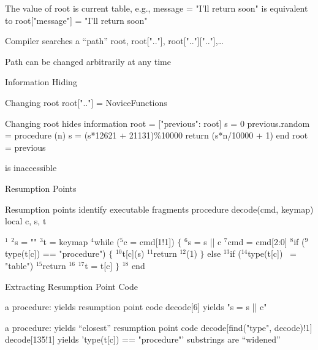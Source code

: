 \Bullet The value of {\pt root} is current table, e.g.,
\program
		message = "I'll return soon"
\endprogram
\medskip
		is equivalent to
\program
		root["message"] = "I'll return soon"
\endprogram

\Bullet Compiler searches a ``path''
		 {\pt root, root[".."], root[".."][".."],}\dots

\Bullet Path can be changed arbitrarily at any time
\NewPage
\centerline{\bigrm Information Hiding}\Longtrue
\Bullet Changing {\pt root}
\program
		root[".."] = NoviceFunctions
\endprogram

\Bullet Changing {\pt root} hides information
\program
		root = ["previous": root]
\medskip
		s = 0
		previous.random = procedure (n)
			s = (s*12621 + 21131)\%10000
			return (s*n/10000 + 1)
		end
\medskip
		root = previous
\endprogram

 is inaccessible
\NewPage
\centerline{\bigrm Resumption Points}
\Bullet Resumption points identify executable fragments
\begingroup\medskip\pt
	procedure decode(cmd, keymap)
		local c, s, t

		$^1$
		$^2$s = ""
		$^3$t = keymap
		$^4$while ($^5$c = cmd[1!1]) $\{$
			$^6$s = s || c
			$^7$cmd = cmd[2:0]
			$^8$if ($^9$type(t[c]) == "procedure") $\{$
				$^{10}$t[c](s)
				$^{11}$return $^{12}$(1)
				$\}$
			else $^{13}$if ($^{14}$type(t[c]) ~= "table")
				$^{15}$return $^{16}$
			$^{17}$t = t[c]
			$\}$
		$^{18}$
	end
\endprogram
\NewPage
\centerline{\bigrm Extracting Resumption Point Code}\Longtrue
{} a procedure:
		yields resumption point code
\medskip
		{\pt decode[6]} yields {\pt "s = s || c"}

 a procedure:
		yields ``closest'' resumption point code
\program
		decode[find("type", decode)!1]
		decode[135!1]
\endprogram
\medskip
		yields {\pt 'type(t[c]) == "procedure"'}
		substrings are ``widened''

